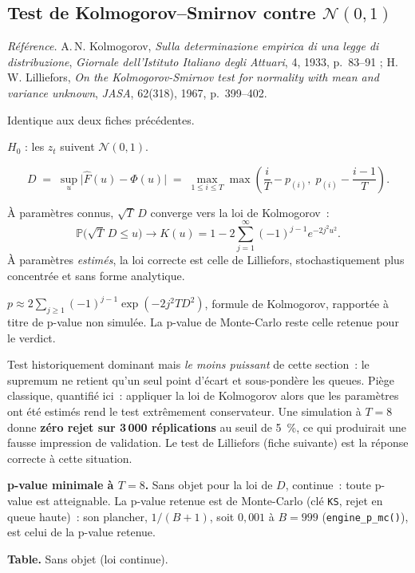 \documentclass[a4paper,11pt]{article}
\newcommand{\code}[1]{\texttt{\small #1}}
\newcommand{\refl}[1]{{\small\textcolor{maincolor!70!black}{\textit{Référence.} #1}}\par\smallskip}
\newcounter{ficheid}
\newenvironment{fiche}[1]{%
  \stepcounter{ficheid}%
  \phantomsection
  \subsection{#1}%
  \label{fiche:\theficheid}%
}{%
  \end{description}\vspace{0.5em}%
}
\newcommand{\Cadre}{%
  \begin{description}[leftmargin=0pt, style=unboxed, itemsep=3pt, topsep=3pt, parsep=2pt]%
  \item[\textcolor{financeblue}{\textbf{1. Cadre, notations et hypothèses de validité (non testées).}}]}
\newcommand{\Hzero}{\item[\textcolor{financeblue}{\textbf{2. Hypothèse nulle.}}]}
\newcommand{\Stat}{\item[\textcolor{financeblue}{\textbf{3. Statistique de test.}}]}
\newcommand{\Loi}{\item[\textcolor{financeblue}{\textbf{4. Loi sous $H_0$.}}]}
\newcommand{\Pval}{\item[\textcolor{financeblue}{\textbf{5. p-value.}}]}
\newcommand{\Usage}{\item[\textcolor{financeblue}{\textbf{6. Usage et limites.}}]}
\newcommand{\Pertinence}{\item[\textcolor{financeblue}{\textbf{7. Pertinence et puissance à faible $T$.}}]}
\begin{document}
\begin{fiche}{Test de Kolmogorov--Smirnov contre $\mathcal{N}(0,1)$}
\label{fiche:kolmogorov-smirnov}%
\refl{A.\,N. Kolmogorov, \emph{Sulla determinazione empirica di una legge di distribuzione},
\emph{Giornale dell'Istituto Italiano degli Attuari}, 4, 1933, p.~83--91 ; H.\,W. Lilliefors,
\emph{On the Kolmogorov-Smirnov test for normality with mean and variance unknown},
\emph{JASA}, 62(318), 1967, p.~399--402.}
\Cadre
Identique aux deux fiches précédentes.
\Hzero
$H_0$ : les $z_t$ suivent $\mathcal{N}(0,1)$.
\Stat
\[
  D \;=\; \sup_{u} \big|\hat F(u) - \Phi(u)\big|
    \;=\; \max_{1\le i\le T} \max\!\left(\frac{i}{T} - p_{(i)},\; p_{(i)} - \frac{i-1}{T}\right).
\]
\Loi
À paramètres connus, $\sqrt{T}\,D$ converge vers la loi de Kolmogorov~:
\[
  \mathbb{P}\big(\sqrt{T}\,D \le u\big) \longrightarrow K(u) = 1 - 2\sum_{j=1}^{\infty}(-1)^{j-1}e^{-2j^2u^2}.
\]
À paramètres \emph{estimés}, la loi correcte est celle de Lilliefors, stochastiquement plus
concentrée et sans forme analytique.
\Pval
$p \approx 2\sum_{j\ge1}(-1)^{j-1}\exp(-2j^2 T D^2)$, formule de Kolmogorov, rapportée à titre de
p-value non simulée. La p-value de Monte-Carlo reste celle retenue pour le verdict.
\Usage
Test historiquement dominant mais \emph{le moins puissant} de cette section~: le supremum ne
retient qu'un seul point d'écart et sous-pondère les queues. Piège classique, quantifié ici~:
appliquer la loi de Kolmogorov alors que les paramètres ont été estimés rend le
test extrêmement conservateur. Une simulation à $T = 8$ donne \textbf{zéro rejet sur 3\,000
réplications} au seuil de 5~\%, ce qui produirait une fausse impression de validation. Le test de
Lilliefors (fiche suivante) est la réponse correcte à cette situation.
\Pertinence
\textbf{p-value minimale à $T = 8$.} Sans objet pour la loi de $D$, continue~: toute p-value est atteignable. La p-value retenue est de Monte-Carlo (clé \code{KS}, rejet en queue haute)~: son plancher, $1/(B+1)$, soit $0{,}001$ à $B = 999$ (\code{engine\_p\_mc()}), est celui de la p-value retenue.

\textbf{Table.} Sans objet (loi continue).


\end{fiche}
\end{document}
